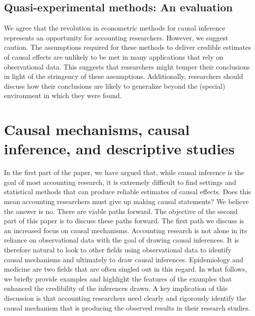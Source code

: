 \documentclass[12pt,reqno,titlepage]{amsart}
\begin{document}
\begin{doublespace}

\subsection{Quasi-experimental methods: An evaluation}
We agree that the revolution in econometric methods for causal inference represents an opportunity for accounting researchers.
However, we suggest caution. 
The assumptions required for these methods to deliver credible estimates of causal effects are unlikely to be met in many applications that rely on observational data. 
This suggests that researchers might temper their conclusions in light of the stringency of these assumptions.
Additionally, researchers should discuss how their conclusions are likely to generalize beyond the (special) environment in which they were found.

\section{Causal mechanisms, causal inference, and descriptive studies} \label{sec:mech}

In the first part of the paper, we have argued that, while causal inference is the goal of most accounting research, it is extremely difficult to find settings and statistical methods that can produce reliable estimates of causal effects. Does this mean accounting researchers must give up making causal statements? We believe the answer is no. There are viable paths forward. The objective of the second part of this paper is to discuss these paths forward. The first path we discuss is an increased focus on causal mechanisms. 
Accounting research is not alone in its reliance on observational data with the goal of drawing causal inferences. 
It is therefore natural to look to other fields using observational data to identify causal mechanisms and ultimately to draw causal inferences. Epidemiology and medicine are two fields that are often singled out in this regard. In what follows, we briefly provide examples and highlight the features of the examples that enhanced the credibility of the inferences drawn. A key implication of this discussion is that accounting researchers need clearly and rigorously identify the causal mechanism that is producing the observed results in their research studies.



\end{doublespace}
\end{document}
